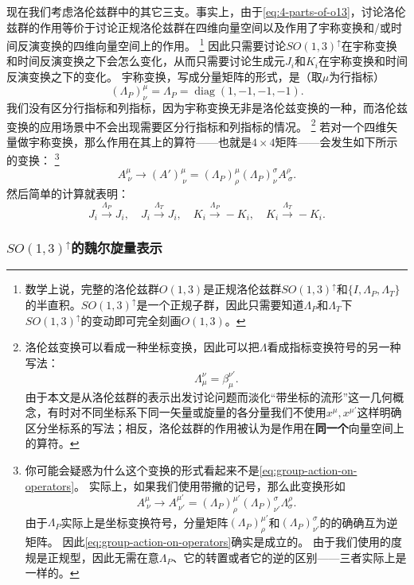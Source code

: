 \documentclass[hyperref, UTF8, a4paper]{ctexart}
\DeclareMathOperator{\diag}{diag}
\begin{document}
现在我们考虑洛伦兹群中的其它三支。事实上，由于\eqref{eq:4-parts-of-o13}，讨论洛伦兹群的作用等价于讨论正规洛伦兹群在四维向量空间以及作用了宇称变换和/或时间反演变换的四维向量空间上的作用。%
\footnote{数学上说，完整的洛伦兹群$O(1,3)$是正规洛伦兹群$SO(1,3)^\uparrow$和$\{I, \Lambda_P, \Lambda_T\}$的半直积。$SO(1,3)^\uparrow$是一个正规子群，因此只需要知道$\Lambda_P$和$\Lambda_T$下$SO(1,3)^\uparrow$的变动即可完全刻画$O(1,3)$。}%
因此只需要讨论$SO(1,3)^\uparrow$在宇称变换和时间反演变换之下会怎么变化，从而只需要讨论生成元$J_i$和$K_i$在宇称变换和时间反演变换之下的变化。
宇称变换，写成分量矩阵的形式，是（取$\mu$为行指标）
\[
    (\Lambda_P)^\mu_\nu = \Lambda_P = \diag(1, -1, -1, -1).
\]
我们没有区分行指标和列指标，因为宇称变换无非是洛伦兹变换的一种，而洛伦兹变换的应用场景中不会出现需要区分行指标和列指标的情况。%
\footnote{洛伦兹变换可以看成一种坐标变换，因此可以把$\Lambda$看成指标变换符号的另一种写法：
\[
    \Lambda_\mu^\nu = \beta_{\mu}^{\nu'}.
\]
由于本文是从洛伦兹群的表示出发讨论问题而淡化“带坐标的流形”这一几何概念，有时对不同坐标系下同一矢量或旋量的各分量我们不使用$x^\mu, x^{\mu'}$这样明确区分坐标系的写法；相反，洛伦兹群的作用被认为是作用在\textbf{同一个}向量空间上的算符。
}%
若对一个四维矢量做宇称变换，那么作用在其上的算符——也就是$4\times 4$矩阵——会发生如下所示的变换：%
\footnote{你可能会疑惑为什么这个变换的形式看起来不是\eqref{eq:group-action-on-operators}。
实际上，如果我们使用带撇的记号，那么此变换形如
\[
    A^\mu_{\ \nu} \longrightarrow A^{\mu'}_{\ \nu'} = (\Lambda_P)^{\mu'}_\rho (\Lambda_P)^\sigma_{\nu'} \Lambda^\rho_\sigma.
\]
由于$\Lambda_P$实际上是坐标变换符号，分量矩阵$(\Lambda_P)^{\mu'}_\rho$和$(\Lambda_P)^\sigma_{\nu'}$的的确确互为逆矩阵。
因此\eqref{eq:group-action-on-operators}确实是成立的。
由于我们使用的度规是正规型，因此无需在意$\Lambda_P$、它的转置或者它的逆的区别——三者实际上是一样的。
}%
\[
    A^\mu_{\ \nu} \longrightarrow (A')^\mu_{\ \nu} = (\Lambda_P)^\mu_\rho (\Lambda_P)^\sigma_\nu A^\rho_{\ \sigma}.
\]
然后简单的计算就表明：
\begin{equation}
    J_i \stackrel{\Lambda_P}{\longrightarrow} J_i, \quad J_i \stackrel{\Lambda_T}{\longrightarrow} J_i, \quad K_i \stackrel{\Lambda_P}{\longrightarrow} - K_i, \quad K_i \stackrel{\Lambda_T}{\longrightarrow} - K_i.
    \label{eq:parity-and-time-reversion-transform}
\end{equation}

\subsubsection{$SO(1,3)^\uparrow$的魏尔旋量表示}\label{sec:weyl-spinor-representation}
\end{document}
